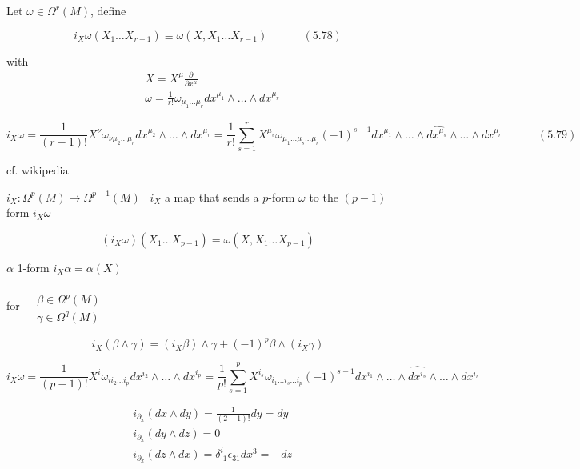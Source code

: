 \documentclass[twoside]{amsart}
\begin{document}
Let $\omega \in \Omega^r(M)$, define

\begin{equation}
  i_X \omega(X_1 \dots X_{r-1}) \equiv \omega(X,X_1 \dots X_{r-1} ) \quad \quad \quad \, (5.78)
\end{equation}

with
\[
\begin{aligned}
  & X = X^{\mu} \frac{ \partial}{ \partial x^{ \mu} } \\ 
  &  \omega = \frac{1}{r!} \omega_{\mu_1 \dots \mu_r} dx^{\mu_1} \wedge \dots \wedge dx^{\mu_r}
\end{aligned}
\]

\begin{equation}
  i_X \omega = \frac{1}{ (r-1)!} X^{\nu} \omega_{\nu \mu_2 \dots \mu_r} dx^{\mu_2} \wedge \dots \wedge dx^{\mu_r} = \frac{1}{r!} \sum_{s=1}^r X^{\mu_s} \omega_{ \mu_1 \dots \mu_s \dots \mu_r }(-1)^{s-1} dx^{\mu_1} \wedge \dots \wedge \widehat{ dx^{\mu_s} } \wedge \dots \wedge dx^{\mu_r} \quad \quad \quad \, (5.79)
\end{equation}

cf. wikipedia

$i_X: \Omega^p(M) \to \Omega^{p-1}(M)$ \quad \quad \, $i_X$ a map that sends a $p$-form $\omega$ to the $(p-1)$ form $i_X \omega$

\[
(i_X \omega)(X_1 \dots X_{p-1}) = \omega(X,X_1 \dots X_{p-1} )
\]

$\alpha$ 1-form $i_X\alpha = \alpha(X)$


for $\begin{aligned} & \quad \\ 
  & \beta \in \Omega^p(M) \\ 
  & \gamma \in \Omega^q(M) \end{aligned}$

\[
i_X(\beta \wedge \gamma) = (i_X \beta) \wedge \gamma + (-1)^p \beta \wedge (i_X \gamma )
\]

\[
i_X \omega = \frac{1}{ (p-1)!} X^i \omega_{ii_2 \dots i_p} dx^{i_2} \wedge \dots \wedge dx^{i_p} = \frac{1}{ p!} \sum_{s=1}^p X^{i_s} \omega_{ i_1 \dots i_s \dots i_p }(-1)^{s-1} dx^{i_1} \wedge \dots \wedge \widehat{dx^{i_s}} \wedge \dots \wedge dx^{i_r}
\]

\[
\begin{aligned}
  & i_{\partial_x}(dx \wedge dy) = \frac{1}{ (2-1)!} dy = dy \\ 
  & i_{\partial_x}(dy \wedge dz) = 0 \\  
  & i_{\partial_x}( dz \wedge dx) = \delta^i_{ \, \, 1 } \epsilon_{31} dx^3 = -dz
\end{aligned}
\]
\end{document}
